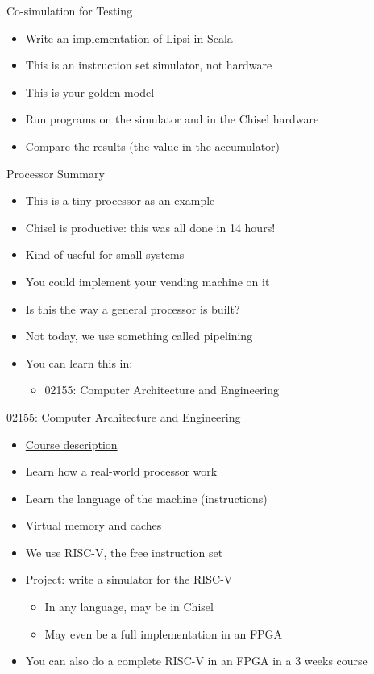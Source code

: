 \begin{frame}[fragile]{Co-simulation for Testing}
\begin{itemize}
\item Write an implementation of Lipsi in Scala
\item This is an instruction set simulator, not hardware
\item This is your golden model
\item Run programs on the simulator and in the Chisel hardware
\item Compare the results (the value in the accumulator)
\end{itemize}
\end{frame}

\begin{frame}[fragile]{Processor Summary}
\begin{itemize}
\item This is a tiny processor as an example
\item Chisel is productive: this was all done in 14 hours!
\item Kind of useful for small systems
\item You could implement your vending machine on it
\item Is this the way a general processor is built?
\item Not today, we use something called pipelining
\item You can learn this in:
\begin{itemize}
\item 02155: Computer Architecture and Engineering
\end{itemize}
\end{itemize}
\end{frame}

\begin{frame}[fragile]{02155: Computer Architecture and Engineering}
\begin{itemize}
\item \href{http://www2.imm.dtu.dk/courses/02155/}{Course description}
\item Learn how a real-world processor work
\item Learn the language of the machine (instructions)
\item Virtual memory and caches
\item We use RISC-V, the free instruction set
\item Project: write a simulator for the RISC-V
\begin{itemize}
\item In any language, may be in Chisel
\item May even be a full implementation in an FPGA
\end{itemize}
\item You can also do a complete RISC-V in an FPGA in a 3 weeks course
\end{itemize}
\end{frame}

